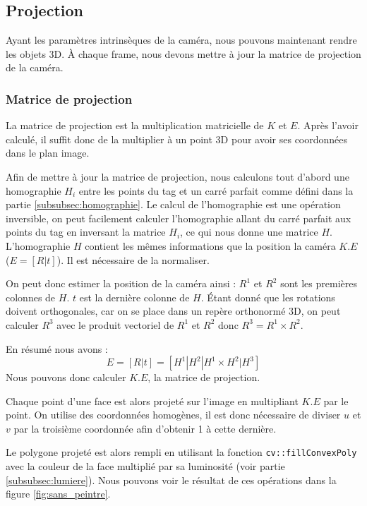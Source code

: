         \subsection{Projection}
        \label{subsec:projection}
            Ayant les paramètres intrinsèques de la caméra, nous pouvons maintenant rendre les objets 3D. À chaque frame, nous devons mettre à jour la matrice de projection de la caméra.

            \subsubsection{Matrice de projection}
                La matrice de projection est la multiplication matricielle de $K$ et $E$. Après l'avoir calculé, il suffit donc de la multiplier à un point 3D pour avoir ses coordonnées dans le plan image.

                Afin de mettre à jour la matrice de projection, nous calculons tout d'abord une homographie $H_i$ entre les points du tag et un carré parfait comme défini dans la partie \ref{subsubsec:homographie}. Le calcul de l'homographie est une opération inversible, on peut facilement calculer l'homographie allant du carré parfait aux points du tag en inversant la matrice $H_i$, ce qui nous donne une matrice $H$. L'homographie $H$ contient les mêmes informations que la position la caméra $K.E$ ($E = [R|t]$). Il est nécessaire de la normaliser. 

                On peut donc estimer la position de la caméra ainsi :
                $R^1$ et $R^2$ sont les premières colonnes de $H$. $t$ est la dernière colonne de $H$. Étant donné que les rotations doivent orthogonales, car on se place dans un repère orthonormé 3D, on peut calculer $R^3$ avec le produit vectoriel de $R^1$ et $R^2$ donc $R^3 = R^1 \times R^2$.

                En résumé nous avons :
                \begin{equation*}
                    E = [R|t] = [H^1 | H^2 | H^1\times H^2 | H^3]
                \end{equation*}
                Nous pouvons donc calculer $K.E$, la matrice de projection.
                
                Chaque point d'une face est alors projeté sur l'image en multipliant $K.E$ par le point. On utilise des coordonnées homogènes, il est donc nécessaire de diviser $u$ et $v$ par la troisième coordonnée afin d'obtenir 1 à cette dernière. 

                Le polygone projeté est alors rempli en utilisant la fonction \verb|cv::fillConvexPoly| avec la couleur de la face multiplié par sa luminosité (voir partie \ref{subsubsec:lumiere}). Nous pouvons voir le résultat de ces opérations dans la figure \ref{fig:sans_peintre}.

